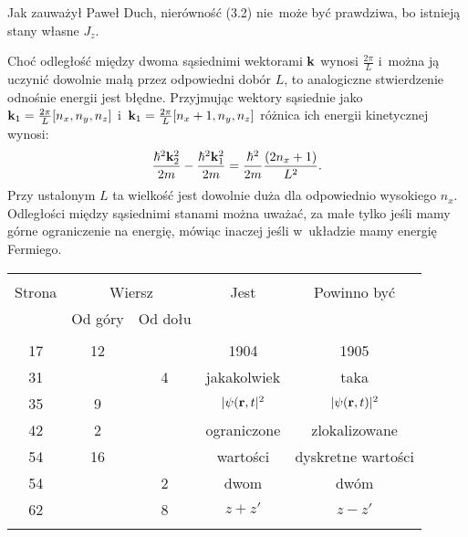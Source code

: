 \documentclass[a4paper,11pt]{article}
\begin{document}
\noindent
{} Jak zauważył Paweł Duch, nierówność (3.2)
nie~może być prawdziwa, bo istnieją stany własne $J_{ z }$.

\vspace{\spaceFour}



\noindent
{} Choć odległość między dwoma sąsiednimi
wektorami $\mathbf{k}$ wynosi $\frac{ 2 \pi }{ L }$ i~można ją
uczynić dowolnie małą przez odpowiedni dobór $L$, to analogiczne
stwierdzenie odnośnie energii jest błędne. Przyjmując wektory
sąsiednie jako
$\mathbf{k}_{ 1 } = \frac{ 2 \pi }{ L } [ n_{ x }, n_{ y }, n_{ z } ]$
i~$\mathbf{k}_{ 1 } = \frac{ 2 \pi }{ L } [ n_{ x } + 1, n_{ y }, n_{ z } ]$
różnica ich energii kinetycznej wynosi:
\begin{equation}
  \label{eq:Schiff-01}
  \frac{ \hbar^{ 2 } \mathbf{k}_{ 2 }^{ 2 } }{ 2 m }
  - \frac{ \hbar^{ 2 } \mathbf{k}_{ 1 }^{ 2 } }{ 2 m }
  = \frac{ \hbar^{ 2 } }{ 2 m } \frac{ ( 2 n_{ x } + 1 ) }{ L^{ 2 } }.
\end{equation}
Przy ustalonym $L$ ta wielkość jest dowolnie duża dla odpowiednio
wysokiego $n_{ x }$. Odległości między sąsiednimi stanami można
uważać, za małe tylko jeśli mamy górne ograniczenie na energię,
mówiąc inaczej jeśli w~układzie mamy energię Fermiego.







\begin{center}

  \begin{tabular}{|c|c|c|c|c|}
    \hline
    & \multicolumn{2}{c|}{} & & \\
    Strona & \multicolumn{2}{c|}{Wiersz} & Jest
                              & Powinno być \\ \cline{2-3}
    & Od góry & Od dołu & & \\
    \hline
    & & & & \\
    17 & 12 & & 1904 & 1905 \\
    31 & & 4 & jakakolwiek & taka \\
    35 & 9 & & $| \psi( \mathbf{r}, t |^{ 2 }$ & $| \psi( \mathbf{r}, t ) |^{ 2 }$ \\
    42 & 2 & & ograniczone & zlokalizowane \\
    54 & 16 & & wartości & dyskretne wartości \\
    54 & & 2 & dwom & dwóm \\
    62 & & 8 & $z + z'$ & $z - z'$ \\
    & & & & \\
    \hline
  \end{tabular}

\end{center}
\end{document}
